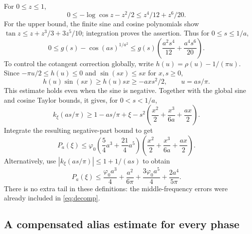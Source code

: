 \documentclass[11pt]{article}
\newcommand{\phz}{\varphi_0}
\begin{document}
For $0\le z\le1$,
\[
 0\le-\log\cos z-z^2/2\le z^4/12+z^6/20.
\]
For the upper bound, the finite sine and cosine polynomials show
$\tan z\le z+z^3/3+3z^5/10$; integration proves the assertion.
Thus for $0\le s\le1/a$,
\[
 0\le g(s)-\cos(as)^{1/a^2}
 \le g(s)\left(\frac{a^2s^4}{12}+\frac{a^4s^6}{20}\right).
\]
To control the cotangent correction globally, write
$h(u)=\rho(u)-1/(\pi u)$. Since $-\pi u/2\le h(u)\le0$ and
$\sin(sx)\le sx$ for $x,s\ge0$,
\[
 h(u)\sin(sx)\ge h(u)sx\ge-ax s^2/2,
 \qquad u=as/\pi.
\]
This estimate holds even when the sine is negative. Together with the
global sine and cosine Taylor bounds, it gives, for $0<s<1/a$,
\[
 k_\xi(as/\pi)\ge1-as/\pi+\xi
  -s^2\left(\frac{x^2}2+\frac{x^3}{6a}+\frac{ax}2\right).
\]
Integrate the resulting negative-part bound to get
\begin{equation}\label{eq:Psmall}
 P_a(\xi)\le\phz\left(\frac54a^3+\frac{21}4a^5\right)
             \left(\frac{x^2}2+\frac{x^3}{6a}+\frac{ax}2\right).
\end{equation}
Alternatively, use $|k_\xi(as/\pi)|\le1+1/(as)$ to obtain
\begin{equation}\label{eq:Plarge}
 P_a(\xi)\le\frac{\phz a^3}4+\frac{a^2}{6\pi}
                        +\frac{3\phz a^5}4+\frac{2a^4}{5\pi}.
\end{equation}
There is no extra tail in these definitions: the middle-frequency errors
were already included in \eqref{eq:decomp}.

\subsection{A compensated alias estimate for every phase}
\end{document}
